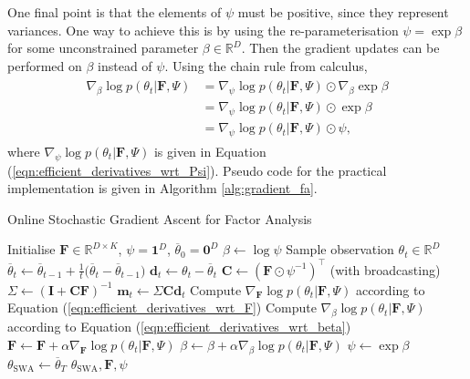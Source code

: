\documentclass[msc,deptreport.inf]{infthesis} %
\newcommand{\matr}[1]{\mathbf{#1}}
\newcommand{\R}{\mathbb R}
\begin{document}
One final point is that the elements of $\psi$ must be positive, since they represent variances. One way to achieve this is by using the re-parameterisation $\psi = \exp \beta$ for some unconstrained parameter $\beta \in \R^D$. Then the gradient updates can be performed on $\beta$ instead of $\psi$. Using the chain rule from calculus, 
\begin{align}
\begin{split}\label{eqn:efficient_derivatives_wrt_beta}
	\nabla_{\beta} \log p(\theta_t | \matr{F}, \Psi)
	& = \nabla_{\psi} \log p(\theta_t | \matr{F}, \Psi) \odot \nabla_{\beta} \exp \beta \\
	& = \nabla_{\psi} \log p(\theta_t | \matr{F}, \Psi) \odot \exp \beta \\
	& = \nabla_{\psi} \log p(\theta_t | \matr{F}, \Psi) \odot \psi,
\end{split}
\end{align} 
where $\nabla_{\psi} \log p(\theta_t | \matr{F}, \Psi)$ is given in Equation (\ref{eqn:efficient_derivatives_wrt_Psi}). Pseudo code for the practical implementation is given in Algorithm \ref{alg:gradient_fa}.

\begin{algorithm}[!htbp] 
	\caption{Online Stochastic Gradient Ascent for Factor Analysis}
	\label{alg:gradient_fa}
	\begin{algorithmic}[1]
		\State Initialise $\matr{F} \in \R^{D \times K}$, $\psi = \matr{1}^D$, $\overline{\theta}_0 = \matr{0}^D$
		\State $\beta \leftarrow \log \psi$
			\State Sample observation $\theta_t \in \R^D$
			\State
				$\overline{\theta}_t \leftarrow  \overline{\theta}_{t-1} + \frac{1}{t}\big(\overline{\theta}_t - \overline{\theta}_{t-1}\big)$
			\State $\matr{d}_t \leftarrow \theta_t - \overline{\theta}_t$
			\State $\matr{C} \leftarrow (\matr{F} \odot \psi^{-1})^\intercal$ (with broadcasting)
			\State $\Sigma \leftarrow (\matr{I} + \matr{C} \matr{F})^{-1}$ 
			\State $\matr{m}_t \leftarrow \Sigma \matr{C} \matr{d}_t$ 
			\State Compute $\nabla_{\matr{F}} \log p(\theta_t | \matr{F}, \Psi)$ 
			according to Equation (\ref{eqn:efficient_derivatives_wrt_F})
			\State Compute $\nabla_{\beta} \log p(\theta_t | \matr{F}, \Psi)$ 
			according to Equation (\ref{eqn:efficient_derivatives_wrt_beta})
			\State $\matr{F} \leftarrow \matr{F} + \alpha \nabla_{\matr{F}} \log p(\theta_t | \matr{F}, \Psi)$
			\State $\beta \leftarrow \beta + \alpha \nabla_{\beta} \log p(\theta_t | \matr{F}, \Psi)$
			\State $\psi \leftarrow \exp \beta$
		\EndFor
		\State $\theta_{\text{SWA}} \leftarrow \overline{\theta}_T$
		\State \Return $\theta_{\text{SWA}}, \matr{F}, \psi$
	\end{algorithmic}
\end{algorithm}
\end{document}

